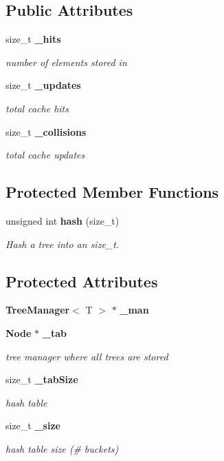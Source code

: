 \subsection*{Public Attributes}
\begin{CompactItemize}
\item 
size\_\-t {\bf \_\-hits}
\begin{CompactList}\small\item\em number of elements stored in \item\end{CompactList}\item 
size\_\-t {\bf \_\-updates}
\begin{CompactList}\small\item\em total cache hits \item\end{CompactList}\item 
size\_\-t {\bf \_\-collisions}
\begin{CompactList}\small\item\em total cache updates \item\end{CompactList}\end{CompactItemize}
\subsection*{Protected Member Functions}
\begin{CompactItemize}
\item 
unsigned int {\bf hash} (size\_\-t)
\begin{CompactList}\small\item\em Hash a tree into an size\_\-t. \item\end{CompactList}\end{CompactItemize}
\subsection*{Protected Attributes}
\begin{CompactItemize}
\item 
{\bf Tree\-Manager}$<$ T $>$ $\ast$ {\bf \_\-man}
\item 
{\bf Node} $\ast$ {\bf \_\-tab}
\begin{CompactList}\small\item\em tree manager where all trees are stored \item\end{CompactList}\item 
size\_\-t {\bf \_\-tab\-Size}
\begin{CompactList}\small\item\em hash table \item\end{CompactList}\item 
size\_\-t {\bf \_\-size}
\begin{CompactList}\small\item\em hash table size (\# buckets) \item\end{CompactList}\end{CompactItemize}
